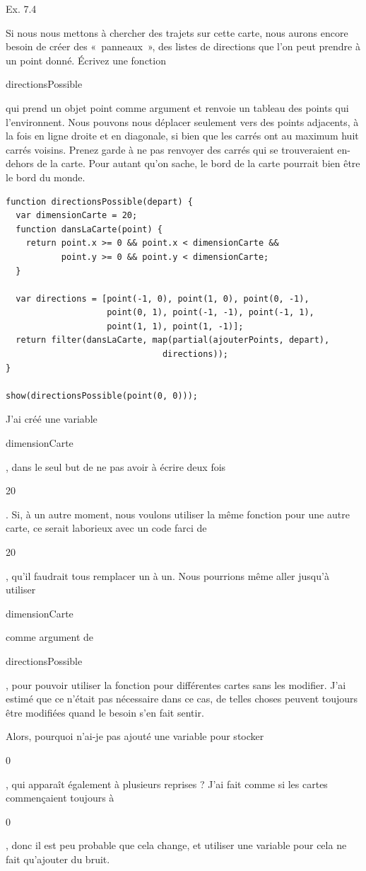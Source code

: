 \documentclass{FramateX}
\renewcommand{\texttt}[1]{\begin{sffamily}{#1}\end{sffamily}}
\begin{document}
Ex. 7.4

Si nous nous mettons à chercher des trajets sur cette carte, nous aurons
encore besoin de créer des «~panneaux~», des listes de directions que
l'on peut prendre à un point donné. Écrivez une fonction
\texttt{directionsPossible} qui prend un objet point comme argument et
renvoie un tableau des points qui l'environnent. Nous pouvons nous
déplacer seulement vers des points adjacents, à la fois en ligne droite
et en diagonale, si bien que les carrés ont au maximum huit carrés
voisins. Prenez garde à ne pas renvoyer des carrés qui se trouveraient
en-dehors de la carte. Pour autant qu'on sache, le bord de la carte
pourrait bien être le bord du monde.

\begin{lstlisting}
function directionsPossible(depart) {
  var dimensionCarte = 20;
  function dansLaCarte(point) {
    return point.x >= 0 && point.x < dimensionCarte &&
           point.y >= 0 && point.y < dimensionCarte;
  }

  var directions = [point(-1, 0), point(1, 0), point(0, -1),
                    point(0, 1), point(-1, -1), point(-1, 1),
                    point(1, 1), point(1, -1)];
  return filter(dansLaCarte, map(partial(ajouterPoints, depart),
                               directions));
}

show(directionsPossible(point(0, 0)));
\end{lstlisting}
J'ai créé une variable \texttt{dimensionCarte}, dans le seul but de ne
pas avoir à écrire deux fois \texttt{20}. Si, à un autre moment, nous
voulons utiliser la même fonction pour une autre carte, ce serait
laborieux avec un code farci de \texttt{20}, qu'il faudrait tous
remplacer un à un. Nous pourrions même aller jusqu'à utiliser
\texttt{dimensionCarte} comme argument de \texttt{directionsPossible},
pour pouvoir utiliser la fonction pour différentes cartes sans les
modifier. J'ai estimé que ce n'était pas nécessaire dans ce cas, de
telles choses peuvent toujours être modifiées quand le besoin s'en fait
sentir.

Alors, pourquoi n'ai-je pas ajouté une variable pour stocker \texttt{0},
qui apparaît également à plusieurs reprises ? J'ai fait comme si les
cartes commençaient toujours à \texttt{0}, donc il est peu probable que
cela change, et utiliser une variable pour cela ne fait qu'ajouter du
bruit.

\begin{center}\end{center}
\end{document}
